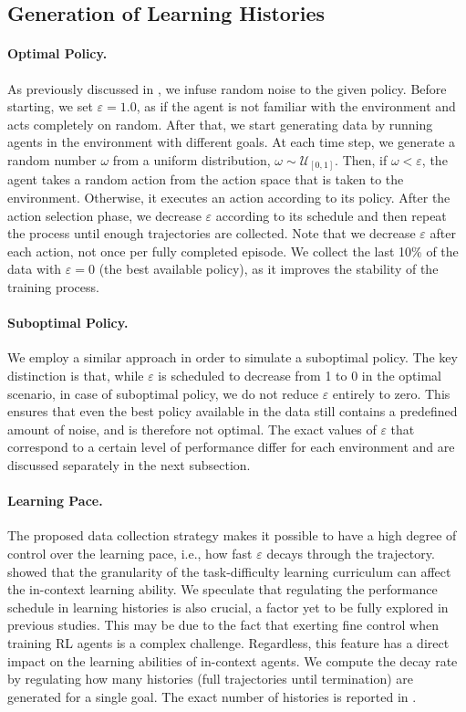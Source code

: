 \documentclass{article}
\theoremstyle{plain}
\theoremstyle{definition}
\theoremstyle{remark}
\begin{document}
\subsection{Generation of Learning Histories}
\label{subsec:gen}
\paragraph{Optimal Policy.} As previously discussed in , we infuse random noise to the given policy. Before starting, we set $\varepsilon=1.0$, as if the agent is not familiar with the environment and acts completely on random. After that, we start generating data by running agents in the environment with different goals. At each time step, we generate a random number $\omega$ from a uniform distribution, $\omega \sim \mathcal{U}_{[0, 1]}$. Then, if $\omega < \varepsilon$, the agent takes a random action from the action space that is taken to the environment. Otherwise, it executes an action according to its policy. After the action selection phase, we decrease $\varepsilon$ according to its schedule and then repeat the process until enough trajectories are collected. Note that we decrease $\varepsilon$ after each action, not once per fully completed episode. We collect the last 10\% of the data with $\varepsilon=0$ (the best available policy), as it improves the stability of the training process.
\paragraph{Suboptimal Policy.}
We employ a similar approach in order to simulate a suboptimal policy. The key distinction is that, while $\varepsilon$ is scheduled to decrease from 1 to 0 in the optimal scenario, in case of suboptimal policy, we do not reduce $\varepsilon$ entirely to zero. This ensures that even the best policy available in the data still contains a predefined amount of noise, and is therefore not optimal. The exact values of $\varepsilon$ that correspond to a certain level of performance differ for each environment and are discussed separately in the next subsection.
\paragraph{Learning Pace.}
The proposed data collection strategy makes it possible to have a high degree of control over the learning pace, i.e., how fast $\varepsilon$ decays through the trajectory. \citet{shi2023crossepisodic} showed that the granularity of the task-difficulty learning curriculum can affect the in-context learning ability. We speculate that regulating the performance schedule in learning histories is also crucial, a factor yet to be fully explored in previous studies. This may be due to the fact that exerting fine control when training RL agents is a complex challenge. Regardless, this feature has a direct impact on the learning abilities of in-context agents.
We compute the decay rate by regulating how many histories (full trajectories until termination) are generated for a single goal. The exact number of histories is reported in .
\end{document}
